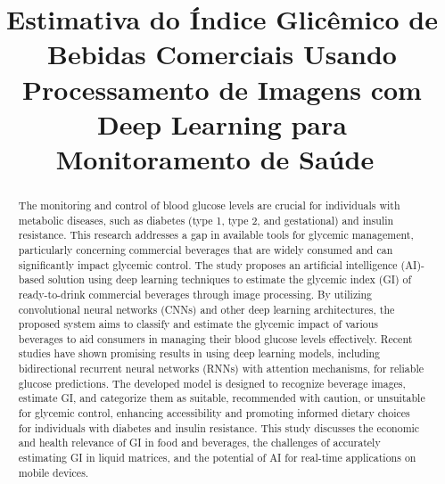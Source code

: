 \documentclass[conference]{IEEEtran}
\begin{document}
\title{Estimativa do Índice Glicêmico de Bebidas Comerciais Usando Processamento de
Imagens com Deep Learning para Monitoramento de Saúde\
}

\author{
\and
{}
}

\maketitle

\begin{abstract}
\sloppy
The monitoring and control of blood glucose levels are crucial for individuals with metabolic diseases, such as diabetes
(type 1, type 2, and gestational) and insulin resistance. This research addresses a gap in available tools for glycemic
management, particularly concerning commercial beverages that are widely consumed and can significantly impact glycemic
control. The study proposes an artificial intelligence (AI)-based solution using deep learning techniques to estimate the
glycemic index (GI) of ready-to-drink commercial beverages through image processing. By utilizing convolutional neural
networks (CNNs) and other deep learning architectures, the proposed system aims to classify and estimate the glycemic
impact of various beverages to aid consumers in managing their blood glucose levels effectively. Recent studies have shown
promising results in using deep learning models, including bidirectional recurrent neural networks (RNNs) with attention
mechanisms, for reliable glucose predictions. The developed model is designed to recognize beverage images, estimate GI,
and categorize them as suitable, recommended with caution, or unsuitable for glycemic control, enhancing accessibility and
promoting informed dietary choices for individuals with diabetes and insulin resistance. This study discusses the economic
and health relevance of GI in food and beverages, the challenges of accurately estimating GI in liquid matrices, and the
potential of AI for real-time applications on mobile devices.
\fussy
\end{abstract}
\end{document}
